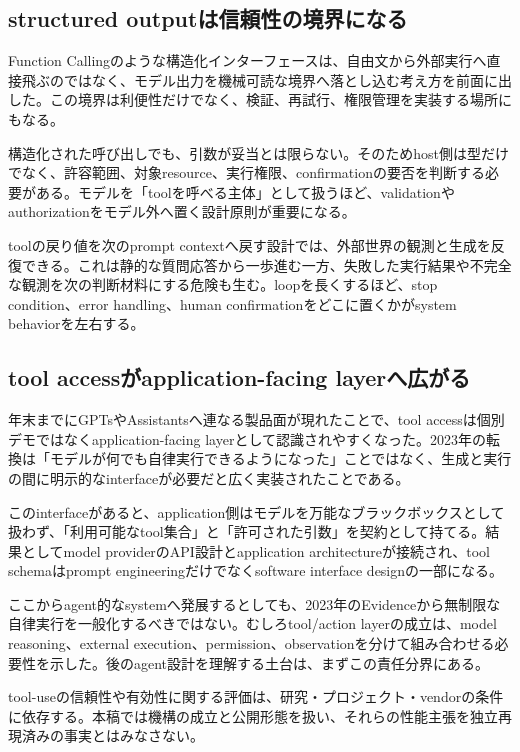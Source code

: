 \subsection{structured outputは信頼性の境界になる}

Function Callingのような構造化インターフェースは、自由文から外部実行へ直接飛ぶのではなく、モデル出力を機械可読な境界へ落とし込む考え方を前面に出した。この境界は利便性だけでなく、検証、再試行、権限管理を実装する場所にもなる。\autocite{src-4de1cea0a896,src-6b76b870b4ae,src-97786632d087,src-e17d0bf10781}


構造化された呼び出しでも、引数が妥当とは限らない。そのためhost側は型だけでなく、許容範囲、対象resource、実行権限、confirmationの要否を判断する必要がある。モデルを「toolを呼べる主体」として扱うほど、validationやauthorizationをモデル外へ置く設計原則が重要になる。\autocite{src-4de1cea0a896,src-6b76b870b4ae,src-97786632d087,src-e17d0bf10781}


toolの戻り値を次のprompt contextへ戻す設計では、外部世界の観測と生成を反復できる。これは静的な質問応答から一歩進む一方、失敗した実行結果や不完全な観測を次の判断材料にする危険も生む。loopを長くするほど、stop condition、error handling、human confirmationをどこに置くかがsystem behaviorを左右する。\autocite{src-4de1cea0a896,src-6b76b870b4ae,src-97786632d087,src-e17d0bf10781}


\subsection{tool accessがapplication-facing layerへ広がる}

年末までにGPTsやAssistantsへ連なる製品面が現れたことで、tool accessは個別デモではなくapplication-facing layerとして認識されやすくなった。2023年の転換は「モデルが何でも自律実行できるようになった」ことではなく、生成と実行の間に明示的なinterfaceが必要だと広く実装されたことである。\autocite{src-4de1cea0a896,src-6b76b870b4ae,src-97786632d087,src-e17d0bf10781}


このinterfaceがあると、application側はモデルを万能なブラックボックスとして扱わず、「利用可能なtool集合」と「許可された引数」を契約として持てる。結果としてmodel providerのAPI設計とapplication architectureが接続され、tool schemaはprompt engineeringだけでなくsoftware interface designの一部になる。\autocite{src-4de1cea0a896,src-6b76b870b4ae,src-97786632d087,src-e17d0bf10781}


ここからagent的なsystemへ発展するとしても、2023年のEvidenceから無制限な自律実行を一般化するべきではない。むしろtool/action layerの成立は、model reasoning、external execution、permission、observationを分けて組み合わせる必要性を示した。後のagent設計を理解する土台は、まずこの責任分界にある。\autocite{src-150e07b331df,src-4de1cea0a896,src-6b76b870b4ae,src-97786632d087,src-e17d0bf10781}


\begin{claimboundary}
tool-useの信頼性や有効性に関する評価は、研究・プロジェクト・vendorの条件に依存する。本稿では機構の成立と公開形態を扱い、それらの性能主張を独立再現済みの事実とはみなさない。\autocite{src-4de1cea0a896,src-6b76b870b4ae,src-97786632d087,src-e17d0bf10781}
\end{claimboundary}
